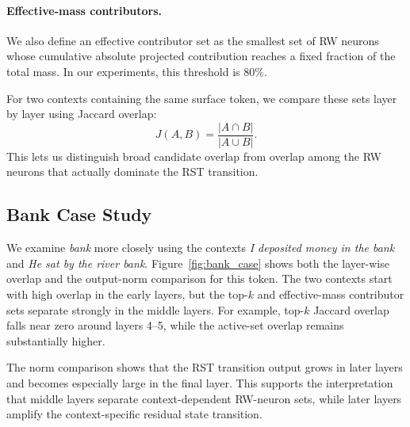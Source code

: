 \documentclass{article}
\begin{document}
\paragraph{Effective-mass contributors.}
We also define an effective contributor set as the smallest set of RW neurons whose cumulative absolute projected contribution reaches a fixed fraction of the total mass. In our experiments, this threshold is 80\%.

For two contexts containing the same surface token, we compare these sets layer by layer using Jaccard overlap:
\begin{equation}
    J(A,B) = \frac{|A\cap B|}{|A\cup B|}.
\end{equation}
This lets us distinguish broad candidate overlap from overlap among the RW neurons that actually dominate the RST transition.

\subsection{Bank Case Study}
\label{app:bank_case}

We examine \emph{bank} more closely using the contexts \emph{I deposited money in the bank} and \emph{He sat by the river bank}. Figure~\ref{fig:bank_case} shows both the layer-wise overlap and the output-norm comparison for this token. The two contexts start with high overlap in the early layers, but the top-$k$ and effective-mass contributor sets separate strongly in the middle layers. For example, top-$k$ Jaccard overlap falls near zero around layers 4--5, while the active-set overlap remains substantially higher.

The norm comparison shows that the RST transition output grows in later layers and becomes especially large in the final layer. This supports the interpretation that middle layers separate context-dependent RW-neuron sets, while later layers amplify the context-specific residual state transition.
\end{document}
